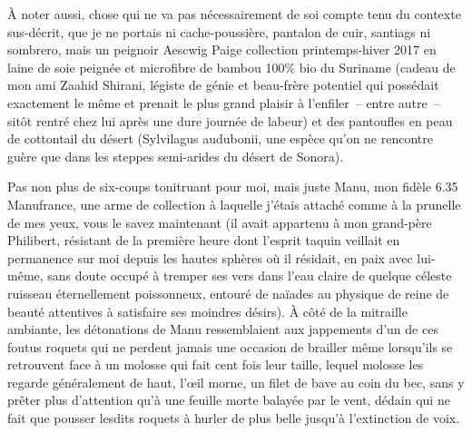 À noter aussi, chose qui ne va pas nécessairement de soi compte tenu du contexte sus-décrit, que je ne portais ni cache-poussière, pantalon de cuir, santiags ni sombrero, mais un peignoir Aescwig Paige collection printemps-hiver 2017 en laine de soie peignée et microfibre de bambou 100\% bio du Suriname (cadeau de mon ami Zaahid Shirani, légiste de génie et beau-frère potentiel qui possédait exactement le même et prenait le plus grand plaisir à l’enfiler~-- entre autre~-- sitôt rentré chez lui après une dure journée de labeur) et des pantoufles en peau de cottontail du désert (Sylvilagus audubonii, une espèce qu’on ne rencontre guère que dans les steppes semi-arides du désert de Sonora).

%

Pas non plus de six-coups tonitruant pour moi, mais juste Manu, mon fidèle 6.35 Manufrance, une arme de collection à laquelle j’étais attaché comme à la prunelle de mes yeux, vous le savez maintenant (il avait appartenu à mon grand-père Philibert, résistant de la première heure dont l’esprit taquin veillait en permanence sur moi depuis les hautes sphères où il résidait, en paix avec lui-même, sans doute occupé à tremper ses vers dans l’eau claire de quelque céleste ruisseau éternellement poissonneux, entouré de naïades au physique de reine de beauté attentives à satisfaire ses moindres désirs). À côté de la mitraille ambiante, les détonations de Manu ressemblaient aux jappements d’un de ces foutus roquets qui ne perdent jamais une occasion de brailler même lorsqu’ils se retrouvent face à un molosse qui fait cent fois leur taille, lequel molosse les regarde généralement de haut, l’œil morne, un filet de bave au coin du bec, sans y prêter plus d’attention qu’à une feuille morte balayée par le vent, dédain qui ne fait que pousser lesdits roquets à hurler de plus belle jusqu’à l’extinction de voix.


